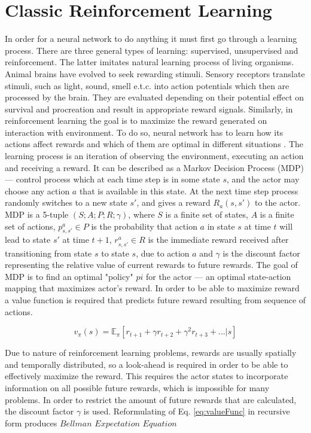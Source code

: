 \section{Classic Reinforcement Learning}\label{classicRL}
In order for a neural network to do anything it must first go through a learning process. There are three general types of learning: supervised, unsupervised and reinforcement. The latter imitates natural learning process of living organisms. Animal brains have evolved to seek rewarding stimuli. Sensory receptors translate stimuli, such as light, sound, smell e.t.c. into action potentials which then are processed by the brain. They are evaluated depending on their potential effect on survival and procreation and result in appropriate reward signals. Similarly, in reinforcement learning the goal is to maximize the reward generated on interaction with environment. To do so, neural network has to learn how its actions affect rewards and which of them are optimal in different situations \cite{34}. 
The learning process is an iteration of observing the environment, executing an action and receiving a reward. It can be described as a Markov Decision Process (MDP) — control process which at each time step is in some state \(s\), and the actor may choose any action \(a\) that is available in this state. At the next time step process randomly 
switches to a new state \(s'\), and gives a reward \(R_a(s,s')\) to the actor.
MDP is a 5-tuple \((S;A;P;R;\gamma)\), where \(S\) is a finite set of states, \(A\) is a finite set of actions, \(p_{s,s'}^a \in P\) is the probability that action \(a\) in state \(s\) at time \(t\) will lead to state \(s'\) at time \(t + 1\), \(r_{s,s'}^a \in R\) is the immediate reward received after transitioning from state \(s\) to state \(s\), due to action \(a\) and \(\gamma\) is the discount factor representing the relative value of current rewards to future rewards. The goal of MDP is to find an optimal "policy" \(pi\) for the actor — an optimal state-action mapping that maximizes actor's reward. In order to be able to maximize reward a value function is required that predicts future reward resulting from sequence of actions.

\begin{equation}
 v_{\pi}(s) = \mathbb{E}_{\pi}[r_{t+1} + \gamma r_{t+2} + \gamma^2 r_{t+3} + ... | s]
\end{equation}\label{eq:valueFunc}

Due to nature of reinforcement learning problems, rewards are usually spatially and temporally distributed, so a look-ahead is required in order to be able to effectively maximize the reward. This requires the actor states to incorporate information on all possible future rewards, which is impossible for many problems. In order to restrict the amount of future rewards that are calculated, the discount factor \(\gamma\) is used. Reformulating of Eq. \ref{eq:valueFunc} in recursive form produces \(Bellman\) \(Expectation\) \(Equation\)

